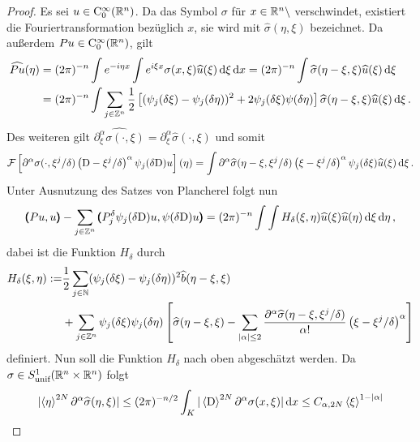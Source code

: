 \begin{proof}
Es sei $u\in\mathrm C^\infty_0(\mathbb R^n)$. Da das Symbol $\sigma$ für $x\in\mathbb R^n\setminus$ verschwindet, existiert die Fouriertransformation bezüglich $x$, sie wird mit $\widehat\sigma (\eta,\xi)$ bezeichnet. Da außerdem $ P u\in\mathrm C^\infty_0(\mathbb R^n)$, gilt
\begin{align*}
\widehat{ P u}(\eta) &= (2\pi)^{-n}\int e^{-i\eta x} \int e^{i\xi x}\sigma(x,\xi) \widehat u (\xi) \,\mathrm d\xi\,\mathrm d x = (2\pi)^{-n}\int \widehat\sigma(\eta - \xi,\xi)\widehat u(\xi)\,\mathrm d\xi \\
&= (2\pi)^ {-n}\int \sum_{j\in\mathbb Z^n} \frac 1 2\left[(\psi_j(\delta \xi) - \psi_j(\delta \eta))^2 + 2 \psi_j(\delta\xi)\psi(\delta \eta)\right] \widehat\sigma(\eta - \xi,\xi)\widehat u(\xi)\,\mathrm d\xi\,.
\end{align*}
Des weiteren gilt $\widehat{\partial^\alpha_\xi\sigma(\cdot,\xi)} = \partial_\xi^\alpha\widehat \sigma(\cdot,\xi)$ und somit
\begin{align*}
\mathcal{F}\left[\partial^\alpha\sigma(\cdot,\xi^j/\delta)\left( \mathrm D - \xi^j/\delta\right)^\alpha\psi_j(\delta\mathrm D)u\right](\eta) = \int \partial ^\alpha\widehat \sigma(\eta-\xi,\xi^j/\delta)\left( \xi - \xi^j/\delta\right)^\alpha\psi_j(\delta\xi)\widehat u(\xi)\,\mathrm d\xi\,.
\end{align*}
Unter Ausnutzung des Satzes von Plancherel folgt nun
\begin{align}
\pmb(Pu,u\pmb)  - \sum_{j\in\mathbb Z^n}\pmb( P_j^\delta\psi_j(\delta\mathrm D )u, \psi(\delta\mathrm D )u \pmb) = (2\pi)^{-n} \int\int H_\delta (\xi,\eta) \widehat u(\xi)\widehat u(\eta)\,\mathrm d\xi\,\mathrm d\eta\,,
\end{align}
dabei ist die Funktion $H_\delta$ durch
\begin{align}\label{eq:hdeltadef}
H_\delta(\xi,\eta) := &\frac 1 2 \sum_{j\in \mathbb N}(\psi_j(\delta \xi) - \psi_j(\delta \eta))^2\widehat b(\eta-\xi,\xi)\\
&+ \sum_{j\in\mathbb Z^n} \psi_j(\delta\xi)\psi_j(\delta \eta)\left[
\widehat \sigma(\eta-\xi,\xi) - \sum_{\lvert\alpha\rvert \le 2} \frac{\partial ^\alpha\widehat\sigma(\eta-\xi,\xi^j/\delta)}{\alpha!}\left( \xi - \xi^j/\delta\right)^\alpha
\right]
\end{align}
definiert. Nun soll die Funktion $H_\delta$ nach oben abgeschätzt werden. Da $\sigma\in S^1_{\text{unif}}(\mathbb R^n\times\mathbb R^n)$ folgt
\begin{align*}
\abs{\braket{\eta}^{2N}\partial^\alpha\widehat\sigma(\eta,\xi)}\le (2\pi)^{-n/2}\int_K |\braket{\mathrm D}^{2N}\partial^\alpha\sigma(x,\xi)|\d x \le C_{\alpha,2N} \braket{\xi}^{1 - \abs \alpha}

\end{align*}
\end{proof}
